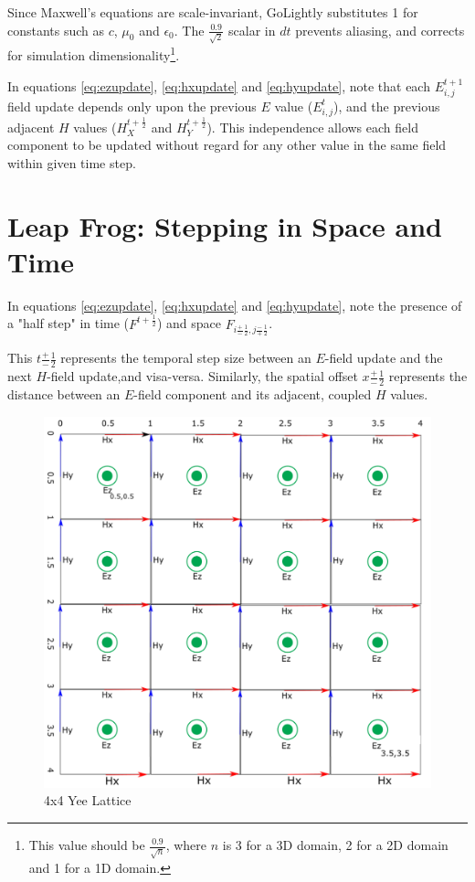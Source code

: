 Since Maxwell's equations are scale-invariant, GoLightly substitutes 1 for constants such as $c$, $\mu_0$ and $\epsilon_0$. The $\frac{0.9}{\sqrt{2}}$ scalar in $dt$ prevents aliasing, and corrects for simulation dimensionality\footnote{This value should be $\frac{0.9}{\sqrt{n}}$, where $n$ is 3 for a 3D domain, 2 for a 2D domain and 1 for a 1D domain.}. 

In equations \ref{eq:ezupdate}, \ref{eq:hxupdate} and \ref{eq:hyupdate}, note that each $E_{i,j}^{t+1}$ field update depends only upon the previous $E$ value ($E_{i,j}^{t}$), and the previous adjacent $H$ values ($H_X^{t+\frac{1}{2}}$ and $H_Y^{t+\frac{1}{2}}$). This independence allows each field component to be updated without regard for any other value in the same field within given time step. 

\clearpage

\section{Leap Frog: Stepping in Space and Time}

In equations \ref{eq:ezupdate}, \ref{eq:hxupdate} and \ref{eq:hyupdate}, note the presence of a "half step" in time ($F^{t + \frac{1}{2}}$) and space $F_{i \frac{+}{-}\frac{1}{2},j \frac{-}{+}\frac{1}{2}}$.

This $t\frac{+}{-}\frac{1}{2}$ represents the temporal step size between an $E$-field update and the next $H$-field update,and visa-versa. Similarly, the spatial offset $x\frac{+}{-}\frac{1}{2}$ represents the distance between an $E$-field component and its adjacent, coupled $H$ values.


\begin{figure}[H]
	\centering
	\includegraphics[width=15cm,keepaspectratio]{YeeMesh.png}
	\caption{4x4 Yee Lattice}
	\label{fig:yeeLattice}
\end{figure}


